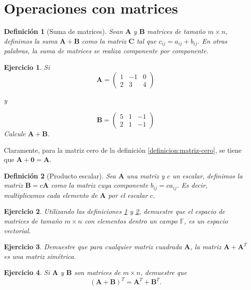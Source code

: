 \documentclass[11pt]{report}
\theoremstyle{break}
\newtheorem{definicion}{Definición}[chapter]
\newtheorem{ejercicio}{Ejercicio}[chapter]
\theoremstyle{break}
\newcommand{\mbb}[1]{$\mathbb{#1}$}
\newcommand{\matdim}[2]{$#1 \times #2$}
\begin{document}
\section{Operaciones con matrices}
\label{seccion:operaciones-matrices}

\begin{definicion}[Suma de matrices]
\label{definicion:suma-matrices}
Sean $\bm{A}$ y $\bm{B}$ matrices de tamaño \matdim{m}{n}, definimos la suma $\bm{A} + \bm{B}$ como la matriz $\bm{C}$ tal que $c_{ij} = a_{ij} + b_{ij}$. En otras palabras, la suma de matrices se realiza componente por componente.
\end{definicion}

\begin{ejercicio}
Si 
$$
\bm{A} = 
\begin{pmatrix}
1 & -1 & 0 \\
2 & 3 & 4
\end{pmatrix}
$$

y 

$$
\bm{B} = 
\begin{pmatrix}
5 & 1 & -1 \\
2 & 1 & -1
\end{pmatrix}
$$
Calcule $\bm{A} + \bm{B}$.
\end{ejercicio}

Claramente, para la matriz cero de la definición \ref{definicion:matriz-cero}, se tiene que $\bm{A} + \bm{0} = \bm{A}$.

\begin{definicion}[Producto escalar]
\label{definicion:producto-escalar}
Sea $\bm{A}$ una matriz y $c$ un escalar, definimos la matriz $\bm{B} = c\bm{A}$ como la matriz cuya componente $b_{ij} = ca_{ij}$. Es decir, multiplicamos cada elemento de $\bm{A}$ por el escalar $c$.
\end{definicion}

\begin{ejercicio}
Utilizando las definiciones \ref{definicion:suma-matrices} y \ref{definicion:producto-escalar}, demuestre que el espacio de matrices de tamaño \matdim{m}{n} con elementos dentro un campo \mbb{F}, es un espacio vectorial.
\end{ejercicio}

\begin{ejercicio}
Demuestre que para cualquier matriz cuadrada $\bm{A}$, la matriz $\bm{A} + \bm{A}^{T}$ es una matriz simétrica.
\end{ejercicio}

\begin{ejercicio}
Si $\bm{A}$ y $\bm{B}$ son matrices de \matdim{m}{n}, demuestre que
$$ \left( \bm{A} + \bm{B} \right) ^{T} = \bm{A}^{T} + \bm{B}^{T}.$$
\end{ejercicio}
\end{document}
